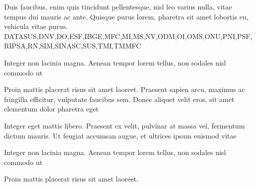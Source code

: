 Duis faucibus, enim quis tincidunt pellentesque, nisl leo varius nulla, vitae tempus dui mauris ac ante. Quisque purus lorem, pharetra sit amet lobortis eu, vehicula vitae purus.
\acrlong{DATASUS},\acrlong{DNV},\acrlong{DO},\acrlong{ESF},\acrlong{IBGE},\acrlong{MFC},\acrlong{MI},\acrlong{MS},\acrlong{NV},\acrlong{ODM},\acrlong{OI},\acrlong{OMS},\acrlong{ONU},\acrlong{PNI},\acrlong{PSF},\acrlong{RIPSA},\acrlong{RN},\acrlong{SIM},\acrlong{SINASC},\acrlong{SUS},\acrlong{TMI},\acrlong{TMMFC}

\begin{alineascomponto}
	\item Integer non lacinia magna. Aenean tempor lorem tellus, non sodales nisl commodo ut
	\item Proin mattis placerat risus sit amet laoreet. Praesent sapien arcu, maximus ac fringilla efficitur, vulputate faucibus sem. Donec aliquet velit eros, sit amet elementum dolor pharetra eget
	\item Integer eget mattis libero. Praesent ex velit, pulvinar at massa vel, fermentum dictum mauris. Ut feugiat accumsan augue, et ultrices ipsum euismod vitae
	\begin{subalineascomponto}
		\item Integer non lacinia magna. Aenean tempor lorem tellus, non sodales nisl commodo ut
		\item Proin mattis placerat risus sit amet laoreet.
	\end{subalineascomponto}
\end{alineascomponto}